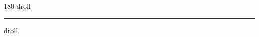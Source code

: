 
\begin{frame}
\begin{center}
\begin{turn}{180}
{\fontsize{2.5cm}{1em}\selectfont droll}
\end{turn}
\vspace{1em}\par  
\hrule
\vspace{1em}\par  
{\fontsize{2.5cm}{1em}\selectfont droll}
\end{center}
\end{frame}

